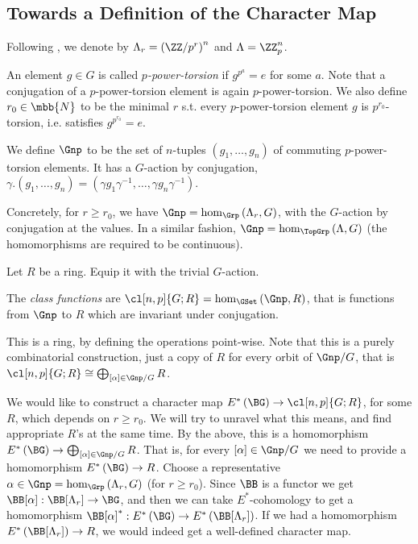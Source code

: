 


\subsection{Towards a Definition of the Character Map}

Following \cite{HKR}, we denote by $\Lambda_r = \left(\ZZ/{p^r}\right)^n$ and $\Lambda = \ZZ_p^n$.

An element $g \in G$ is called \emph{$p$-power-torsion} if $g^{p^a} = e$ for some $a$.
Note that a conjugation of a $p$-power-torsion element is again $p$-power-torsion.
We also define $r_0 \in \mbb{N}$ to be the minimal $r$ s.t. every $p$-power-torsion element $g$ is $p^{r_0}$-torsion, i.e. satisfies $g^{p^{r_0}} = e$.

\begin{definition}
	We define $\Gnp$ to be the set of $n$-tuples $\left(g_1, \dotsc, g_n\right)$ of commuting $p$-power-torsion elements.
	It has a $G$-action by conjugation, $\gamma. \left(g_1, \dotsc, g_n\right) = \left(\gamma g_1 \gamma^{-1}, \dotsc, \gamma g_n \gamma^{-1}\right)$.
\end{definition}

Concretely, for $r \geq r_0$, we have $\Gnp = \hom_{\Grp}\left(\Lambda_r, G\right)$, with the $G$-action by conjugation at the values.
In a similar fashion, $\Gnp = \hom_{\TopGrp}\left(\Lambda, G\right)$ (the homomorphisms are required to be continuous).

Let $R$ be a ring.
Equip it with the trivial $G$-action.

\begin{definition}\label{class-function-*}
	The \emph{class functions} are $\cl[n,p]{G; R} = \hom_{\GSet}\left(\Gnp, R\right)$, that is functions from $\Gnp$ to $R$ which are invariant under conjugation.
\end{definition}

This is a ring, by defining the operations point-wise.
Note that this is a purely combinatorial construction, just a copy of $R$ for every orbit of $\Gnp/G$, that is $\cl[n,p]{G; R} \cong \bigoplus_{\left[\alpha\right] \in \Gnp/G} R$.

We would like to construct a character map $E^*\left(\BG\right) \to \cl[n,p]{G; R}$, for some $R$, which depends on $r \geq r_0$.
We will try to unravel what this means, and find appropriate $R$'s at the same time.
By the above, this is a homomorphism $E^*\left(\BG\right) \to \bigoplus_{\left[\alpha\right] \in \Gnp/G} R$.
That is, for every $\left[\alpha\right] \in \Gnp/G$ we need to provide a homomorphism $E^*\left(\BG\right) \to R$.
Choose a representative $\alpha \in \Gnp = \hom_{\Grp}\left(\Lambda_r, G\right)$ (for $r \geq r_0$).
Since $\BB$ is a functor we get $\BB[\alpha]: \BB[\Lambda_r] \to \BG$, and then we can take $E^*$-cohomology to get a homomorphism $\BB[\alpha]^*: E^*\left(\BG\right) \to E^*\left(\BB[\Lambda_r]\right)$.
If we had a homomorphism $E^*\left(\BB[\Lambda_r]\right) \to R$, we would indeed get a well-defined character map.



